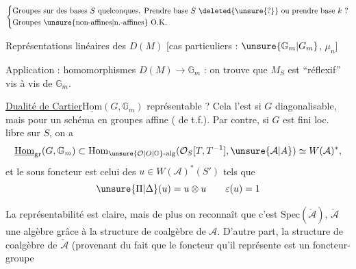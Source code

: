\[
\left\{\begin{aligned}
&\text{Groupes sur des bases } S\ \text{quelconques. Prendre base } S\ \deleted{\unsure{?}}\ \text{ou prendre base } k\ \text{?}\\
&\text{Groupes \unsure{non-affines|n.-affines} O.K.}
\end{aligned}\right.
\]

Représentations linéaires des $D(M)$ [cas particuliers : $\unsure{\mathbb{G}_m|G_m}$, $\mu_n$]

Application : homomorphismes $D(M)\longrightarrow\mathbb{G}_m$ : on trouve que $M_S$ est ``réflexif'' vis à vis de $\mathbb{G}_m$.

\uline{Dualité de Cartier}\quad $\underline{\mathrm{Hom}}(G,\mathbb{G}_m)$  représentable ? Cela l'est si $G$ diagonalisable, mais  pour un schéma en groupes affine ( de t.f.). Par contre, si $G$ est fini loc. libre sur $S$, on a
\reversemarginpar{}\normalmarginpar
\[
\underline{\mathrm{Hom}}_{\mathrm{gr}}(G,\mathbb{G}_m)
\subset \mathrm{Hom}_{\unsure{\mathcal O|O|\mathbb O}\text{-alg}}
(\mathcal O_S[T,T^{-1}],\unsure{\mathcal A|A})\simeq W(\mathcal A)^*,
\]
et le sous foncteur est celui des  $u\in W(\mathcal A)^*(S')$ tels que
\[
\unsure{\Pi|\Delta}(u)=u\otimes u\qquad \varepsilon(u)=1
\]
\margin{[\,\uline{NB} On peut donc oublier la condition $u$ inv. car $\underline{\mathrm{Hom}}_{\mathrm{gr}}(G,\mathbb{G}_m)=\underline{\mathrm{Hom}}_{\unsure{\mathrm{mon}}}(G,\mathcal O^{\unsure{\times|*}})$.}

 La représentabilité est claire, mais de plus on reconnaît que c'est  $\mathrm{Spec}(\check{\mathcal A})$, $\check{\mathcal A}$  une algèbre grâce à la structure de coalgèbre de $\mathcal A$. D'autre part, la structure de coalgèbre de $\check{\mathcal A}$ (provenant du fait que le foncteur qu'il représente est un foncteur-groupe
\reversemarginpar{}\normalmarginpar

